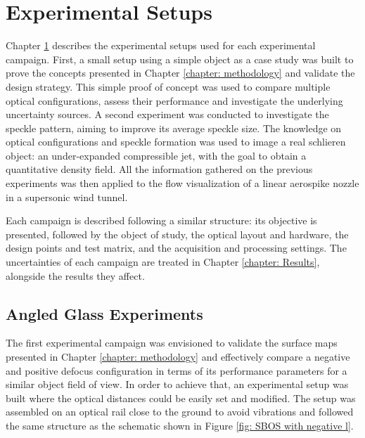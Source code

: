 \chapter{Experimental Setups}
\label{chapter: Experimental Setups}

\par Chapter \ref{chapter: Experimental Setups} describes the experimental setups used for each experimental campaign. First, a small setup using a simple object as a case study was built to prove the concepts presented in Chapter \ref{chapter: methodology} and validate the design strategy. This simple proof of concept was used to compare multiple optical configurations, assess their performance and investigate the underlying uncertainty sources. A second experiment was conducted to investigate the speckle pattern, aiming to improve its average speckle size. The knowledge on optical configurations and speckle formation was used to image a real schlieren object: an under-expanded compressible jet, with the goal to obtain a quantitative density field. All the information gathered on the previous experiments was then applied to the flow visualization of a linear aerospike nozzle in a supersonic wind tunnel.

\par Each campaign is described following a similar structure: its objective is presented, followed by the object of study, the optical layout and hardware, the design points and test matrix, and the acquisition and processing settings. The uncertainties of each campaign are treated in Chapter \ref{chapter: Results}, alongside the results they affect.


\section{Angled Glass Experiments}
\label{section: Angled Glass Experiment}

\par The first experimental campaign was envisioned to validate the surface maps presented in Chapter \ref{chapter: methodology} and effectively compare a negative and positive defocus configuration in terms of its performance parameters for a similar object field of view. In order to achieve that, an experimental setup was built where the optical distances could be easily set and modified. The setup was assembled on an optical rail close to the ground to avoid vibrations and followed the same structure as the schematic shown in Figure \ref{fig: SBOS with negative l}.


